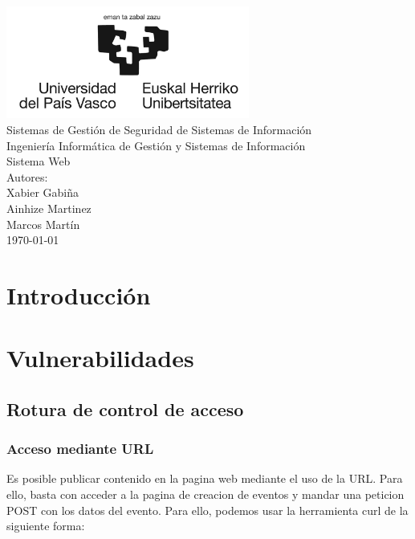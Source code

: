 \documentclass{report}
\begin{document}
    \begin{titlepage}
        \centering
        \includegraphics[width=0.6\textwidth]{./img/miscelanio/logo.jpg}\\
        \vspace{1cm}
        \LARGE Sistemas de Gestión de Seguridad de Sistemas de Información\\
        \vspace{0.5cm}
        \Large Ingeniería Informática de Gestión y Sistemas de Información\\
        \vspace{3cm}
        \Huge Sistema Web\\
        \vspace{2.5cm}
        \Large Autores:\\
        \vspace{0.2cm}
        \large Xabier Gabiña\\
        \large Ainhize Martinez\\
        \large Marcos Martín\\
        \vfill
        \today
    \end{titlepage}
    \tableofcontents
    \chapter{Introducción}
    \chapter{Vulnerabilidades}
        \section{Rotura de control de acceso}
            \subsection{Acceso mediante URL}
                Es posible publicar contenido en la pagina web mediante el uso de la URL.
                Para ello, basta con acceder a la pagina de creacion de eventos y mandar una peticion POST con los datos del evento.
                Para ello, podemos usar la herramienta curl de la siguiente forma:\\
\end{document}
